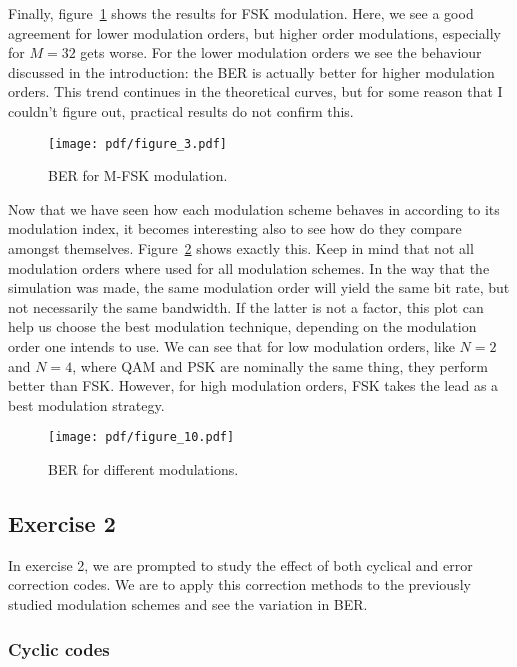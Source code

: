 Finally, figure~\ref{fig:fskberawgnres} shows the results for FSK modulation.
Here, we see a good agreement for lower modulation orders, but higher order
modulations, especially for \(M=32\) gets worse. For the lower modulation orders
we see the behaviour discussed in the introduction: the BER is actually better for
higher modulation orders. This trend continues in the theoretical curves, but for
some reason that I couldn't figure out, practical results do not confirm this.
\begin{figure}
    \centering
    \texttt{[image: pdf/figure\_3.pdf]}
    \caption{BER for M-FSK modulation.\label{fig:fskberawgnres}}
\end{figure}

Now that we have seen how each modulation scheme behaves in according to its
modulation index, it becomes interesting also to see how do they compare amongst
themselves. Figure~\ref{fig:compawgnres} shows exactly this. Keep in mind that not
all modulation orders where used for all modulation schemes. In the way that the
simulation was made, the same modulation order will yield the same bit rate, but
not necessarily the same bandwidth. If the latter is not a factor, this plot can
help us choose the best modulation technique, depending on the modulation order
one intends to use. We can see that for low modulation orders, like \(N=2\) and
\(N=4\), where QAM and PSK are nominally the same thing, they perform better than
FSK\@. However, for high modulation orders, FSK takes the lead as a best
modulation strategy.

\begin{figure}
    \centering
    \texttt{[image: pdf/figure\_10.pdf]}
    \caption{BER for different modulations.\label{fig:compawgnres}}
\end{figure}

\subsection{Exercise 2}

In exercise 2, we are prompted to study the effect of both cyclical and error
correction codes. We are to apply this correction methods to the previously
studied modulation schemes and see the variation in BER\@.

\subsubsection{Cyclic codes}

